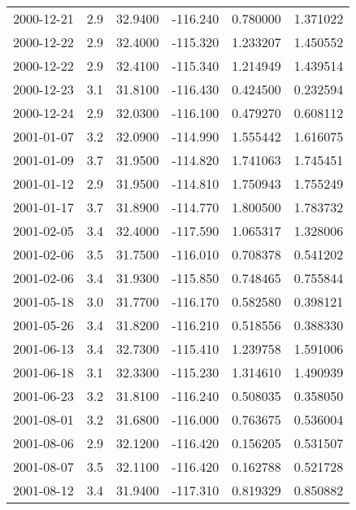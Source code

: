 \begin{tabular}{lrrrrr}
2000-12-21 &       2.9 &  32.9400 &  -116.240 &         0.780000 &         1.371022 \\
2000-12-22 &       2.9 &  32.4000 &  -115.320 &         1.233207 &         1.450552 \\
2000-12-22 &       2.9 &  32.4100 &  -115.340 &         1.214949 &         1.439514 \\
2000-12-23 &       3.1 &  31.8100 &  -116.430 &         0.424500 &         0.232594 \\
2000-12-24 &       2.9 &  32.0300 &  -116.100 &         0.479270 &         0.608112 \\
2001-01-07 &       3.2 &  32.0900 &  -114.990 &         1.555442 &         1.616075 \\
2001-01-09 &       3.7 &  31.9500 &  -114.820 &         1.741063 &         1.745451 \\
2001-01-12 &       2.9 &  31.9500 &  -114.810 &         1.750943 &         1.755249 \\
2001-01-17 &       3.7 &  31.8900 &  -114.770 &         1.800500 &         1.783732 \\
2001-02-05 &       3.4 &  32.4000 &  -117.590 &         1.065317 &         1.328006 \\
2001-02-06 &       3.5 &  31.7500 &  -116.010 &         0.708378 &         0.541202 \\
2001-02-06 &       3.4 &  31.9300 &  -115.850 &         0.748465 &         0.755844 \\
2001-05-18 &       3.0 &  31.7700 &  -116.170 &         0.582580 &         0.398121 \\
2001-05-26 &       3.4 &  31.8200 &  -116.210 &         0.518556 &         0.388330 \\
2001-06-13 &       3.4 &  32.7300 &  -115.410 &         1.239758 &         1.591006 \\
2001-06-18 &       3.1 &  32.3300 &  -115.230 &         1.314610 &         1.490939 \\
2001-06-23 &       3.2 &  31.8100 &  -116.240 &         0.508035 &         0.358050 \\
2001-08-01 &       3.2 &  31.6800 &  -116.000 &         0.763675 &         0.536004 \\
2001-08-06 &       2.9 &  32.1200 &  -116.420 &         0.156205 &         0.531507 \\
2001-08-07 &       3.5 &  32.1100 &  -116.420 &         0.162788 &         0.521728 \\
2001-08-12 &       3.4 &  31.9400 &  -117.310 &         0.819329 &         0.850882 \\

\end{tabular}
